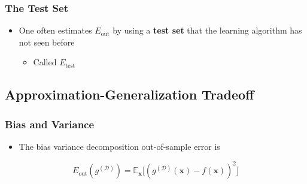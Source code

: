 \documentclass[11pt]{article}
\begin{document}
\subsubsection{The Test Set}
\label{sec:org7654224}
\begin{itemize}
\item One often estimates \(E_\text{out}\) by using a \textbf{test set} that the learning algorithm has not seen before
\begin{itemize}
\item Called \(E_\text{test}\)
\end{itemize}
\end{itemize}

\subsection{Approximation-Generalization Tradeoff}
\label{sec:org870ef91}
\subsubsection{Bias and Variance}
\label{sec:orgebbab53}
\begin{itemize}
\item The bias variance decomposition out-of-sample error is
\end{itemize}
\begin{equation}
  E_\text{out}(g^{(\mathcal D)}) = \mathbb E_{\pmb x} \big[ (g^{(\mathcal D)}(\pmb x) - f(\pmb x))^2 \big]
\end{equation}
\end{document}
